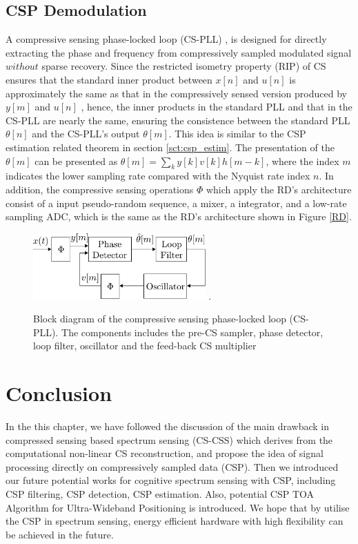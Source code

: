 \subsection{CSP Demodulation}
\indent \indent A compressive sensing phase-locked loop (CS-PLL) \cite{schnelle2012compressive}, is designed for directly extracting the phase and frequency from compressively sampled modulated signal $without$ sparse recovery. Since the restricted isometry property (RIP) of CS ensures that the standard inner product between $x[n]$ and $u[n]$ is approximately the same as that in the compressively sensed version produced by $y[m]$ and $u[n]$ \cite{davenport2010signal}, hence, the inner products in the standard PLL and that in the CS-PLL are nearly the same, ensuring the consistence between the standard PLL $\theta [n]$ and the CS-PLL's output $\theta [m]$. This idea is similar to the CSP estimation related theorem in section \ref{sct:csp_estim}. The presentation of the $\theta [m]$ can be presented as $\theta [m] = \sum_{k} y[k]v[k]h[m-k]$, where the index $m$ indicates the lower sampling rate compared with the Nyquist rate index $n$. In addition, the compressive sensing operations $\Phi$ which apply the RD's architecture consist of a input pseudo-random sequence, a mixer, a integrator, and a low-rate sampling ADC, which is the same as the RD's architecture shown in Figure \ref{RD}.

\begin{figure}[!t]
\centering
\includegraphics[width=2.6in]{figs/pll2.pdf}
\DeclareGraphicsExtensions.
\caption{Block diagram of the compressive sensing phase-locked loop (CS-PLL). The components includes the pre-CS sampler, phase detector, loop filter, oscillator and the feed-back CS multiplier}\label{CS-PLL}
\end{figure}

\section{Conclusion}

\indent \indent In the this chapter, we have followed the discussion of the main drawback in compressed sensing based spectrum sensing (CS-CSS) which derives from the computational non-linear CS reconstruction, and propose the idea of signal processing directly on compressively sampled data (CSP). Then we introduced our future potential works for cognitive spectrum sensing with CSP, including CSP filtering, CSP detection, CSP estimation. Also, potential CSP TOA Algorithm for Ultra-Wideband Positioning is introduced. We hope that by utilise the CSP in spectrum sensing, energy efficient hardware with high flexibility can be achieved in the future. 

